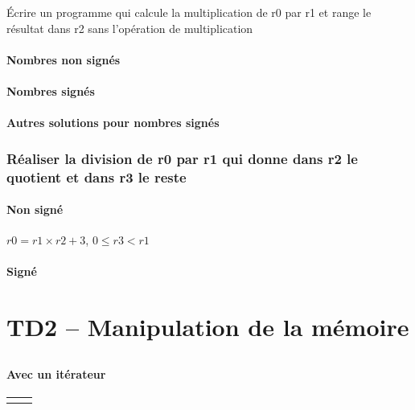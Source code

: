 \documentclass[12pt,a4paper,openany]{book}
\begin{document}
\subsection{}
\'Ecrire un programme qui calcule la multiplication de r0 par r1 et range le résultat dans r2 sans l'opération de multiplication
\subsubsection{Nombres non signés}

\subsubsection{Nombres signés}


\subsubsection{Autres solutions pour nombres signés}


\subsection{Réaliser la division de r0
par r1 qui donne dans r2 le quotient et dans r3
le reste}
\subsubsection{Non signé}
$r0 = r1 \times r2 + 3$, $0 \leq r3 < r1$


\subsubsection{Signé}


\chapter{TD2 -- Manipulation de la mémoire}
\section{}
\subsubsection{Avec un itérateur}
\begin{tabular}{p{8cm}p{8cm}}

	&

\end{tabular}
\end{document}

